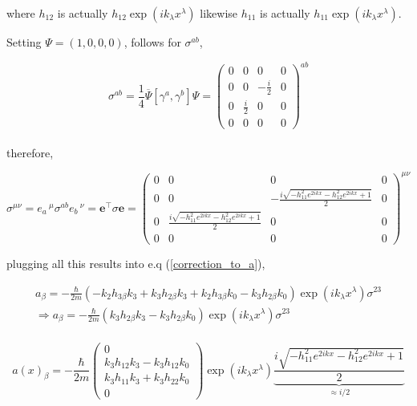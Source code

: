 \documentclass[12pt,a4paper]{article}
\begin{document}
	where $h_{12}$ is actually $h_{12} \exp\left(i k_{\lambda} x^{\lambda}\right)$ likewise $h_{11}$ is actually $h_{11} \exp\left(i k_{\lambda} x^{\lambda}\right)$.
	
	Setting $\Psi = (1,0,0,0)$, follows for $\sigma^{a b}$,
	
	
	$$
	\sigma^{a b} = \frac{1}{4} \overbar{\Psi}[\gamma^a,\gamma^b]\Psi = \left(\begin{matrix}0 & 0 & 0 & 0\\0 & 0 & - \frac{i}{2} & 0\\0 & \frac{i}{2} & 0 & 0\\0 & 0 & 0 & 0\end{matrix}\right)^{ab}
	$$\\
	
	therefore,
	
	$$
	\sigma^{\mu \nu} =  e_a\,^\mu \sigma^{a b} e_b\,^\nu  = \textbf{e}^\top \sigma \textbf{e} = \left(\begin{matrix}0 & 0 & 0 & 0\\0 & 0 & - \frac{i \sqrt{- h_{11}^{2} e^{2 i k x} - h_{12}^{2} e^{2 i k x} + 1}}{2} & 0\\0 & \frac{i \sqrt{- h_{11}^{2} e^{2 i k x} - h_{12}^{2} e^{2 i k x} + 1}}{2} & 0 & 0\\0 & 0 & 0 & 0\end{matrix}\right)^{\mu \nu}
	$$
	
	plugging all this results into e.q (\ref{correction_to_a}),
	
	
	\begin{multline}
		a_\beta = -\frac{\hbar}{2m}\left(- k_2  h_{3 \beta}  k_3 + k_3 h_{2 \beta}  k_3  + k_2  h_{3 \beta}  k_0 - k_3  h_{2 \beta}  k_0\right) \exp\left(i k_{\lambda} x^{\lambda}\right) \sigma^{23} \\
		\Rightarrow a_\beta = -\frac{\hbar}{2m}\left( k_3 h_{2 \beta}  k_3  - k_3  h_{2 \beta}  k_0\right) \exp\left(i k_{\lambda} x^{\lambda}\right) \sigma^{23} \\
	\end{multline}
	
	
	$$
	a(x)_\beta = -\frac{\hbar}{2m}\left(\begin{matrix}0\\k_3 h_{12}  k_3  - k_3  h_{12}  k_0\\k_3 h_{11}  k_3  + k_3  h_{22}  k_0\\0\end{matrix}\right)\exp \left(i k_{\lambda} x^{\lambda}\right) \underbrace{\frac{i \sqrt{- h_{11}^{2} e^{2 i k x} - h_{12}^{2} e^{2 i k x} + 1}}{2}}_{\approx i/2}
	$$
	
\end{document}
